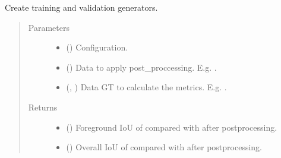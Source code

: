 \documentclass[letterpaper,10pt,english]{sphinxmanual}
\begin{document}
\begin{fulllineitems}
\label{\detokenize{data/post_processing/init:data.post_processing.apply_post_processing}}
Create training and validation generators.
\begin{quote}\begin{description}
\item[{Parameters}] \leavevmode\begin{itemize}
\item {} 
 () \textendash{} Configuration.

\item {} 
 () \textendash{} Data to apply post\_proccessing. E.g. .

\item {} 
 (, ) \textendash{} Data GT to calculate the metrics. E.g. .

\end{itemize}

\item[{Returns}] \leavevmode
\begin{itemize}
\item {} 
 () \textendash{} Foreground IoU of  compared with  after post\sphinxhyphen{}processing.

\item {} 
 () \textendash{} Overall IoU of  compared with  after post\sphinxhyphen{}processing.

\end{itemize}


\end{description}\end{quote}

\end{fulllineitems}
\end{document}
